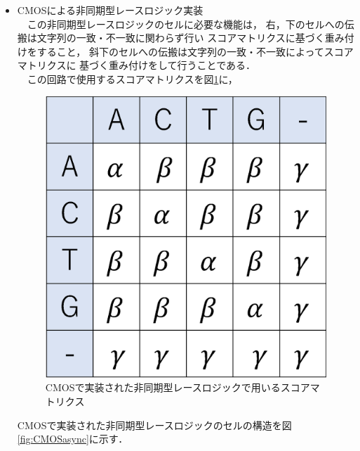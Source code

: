 \begin{itemize}
\item CMOSによる非同期型レースロジック実装\\
 \ \ この非同期型レースロジックのセルに必要な機能は，
右，下のセルへの伝搬は文字列の一致・不一致に関わらず行い
スコアマトリクスに基づく重み付けをすること，
斜下のセルへの伝搬は文字列の一致・不一致によってスコアマトリクスに
基づく重み付けをして行うことである．\\
\ \ この回路で使用するスコアマトリクスを図\ref{fig:scoreasync}に，
\begin{figure}[t!]
\begin{center}
\includegraphics[keepaspectratio,scale=0.4]{fig/2/CMOSasyncscore.eps}
\caption{CMOSで実装された非同期型レースロジックで用いるスコアマトリクス}
\label{fig:scoreasync}
\end{center}
\end{figure}
CMOSで実装された非同期型レースロジックのセルの構造を図\ref{fig:CMOSasync}に示す．\\
\begin{figure}[t!]
\begin{center}

\end{center}
\end{figure}
\end{itemize}
